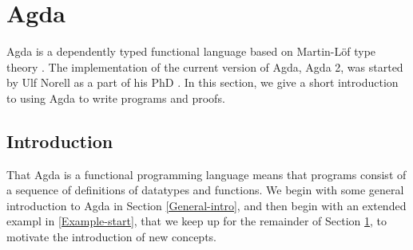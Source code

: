 \chapter{Agda}
\label{Agda}
Agda is a dependently typed functional language based on Martin-Löf type theory \citep{Martin-Lof}. The implementation of the current version of Agda, Agda 2, was started by Ulf Norell as a part of his PhD \citep{NorellAgda}.
In this section, we give a short introduction to using Agda to write programs and proofs.

\section{Introduction}
That Agda is a functional programming language means that programs consist of a sequence of definitions of datatypes and functions. We begin with some general introduction to Agda in Section \ref{General-intro}, and then begin with an extended exampl in \ref{Example-start}, that we keep up for the remainder of Section \ref{Agda}, to motivate the introduction of new concepts.
